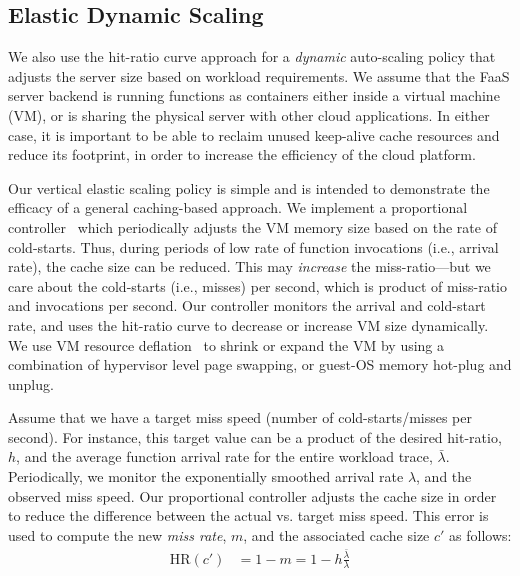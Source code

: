 

\subsection{Elastic Dynamic Scaling}
\label{subsec:dynamic}

We also use the hit-ratio curve approach for a \emph{dynamic} auto-scaling policy that adjusts the server size based on workload requirements. 
%
We assume that the FaaS server backend is running functions as containers either inside a virtual machine (VM), or is sharing the physical server with other cloud applications. 
In either case, it is important to be able to reclaim unused keep-alive cache resources and reduce its footprint, in order to increase the efficiency of the cloud platform. 

Our vertical elastic scaling policy is simple and is intended to demonstrate the efficacy of a general caching-based approach. 
We implement a  proportional controller~\cite{pid-wiki} which periodically adjusts the VM memory size based on the rate of cold-starts.  
Thus, during periods of low rate of function invocations (i.e., arrival rate), the cache size can be reduced. 
This may \emph{increase} the miss-ratio---but we care about the cold-starts (i.e., misses) per second, which is product of miss-ratio and invocations per second.
Our controller monitors the arrival and cold-start rate, and uses the hit-ratio curve to decrease or increase VM size dynamically. 
We use VM resource deflation~\cite{deflation-eurosys19} to shrink or expand the VM by using a combination of hypervisor level page swapping, or guest-OS memory hot-plug and unplug. 


Assume that we have a target miss speed (number of cold-starts/misses per second).
For instance, this target value can be a product of the desired hit-ratio, $h$, and the average function arrival rate for the entire workload trace, $\bar{\lambda}$. 
Periodically, we monitor the exponentially smoothed arrival rate $\lambda$, and the observed miss speed.
Our proportional controller adjusts the cache size in order to reduce the difference between the actual vs. target miss speed.
This error is used to compute the new \emph{miss rate}, $m$, and the associated cache size $c'$ as follows:
\begin{align}
  \label{eq:dyn}
  \text{HR}(c') & = 1-m = 1 - h\frac{\bar{\lambda}}{\lambda}
\end{align}

